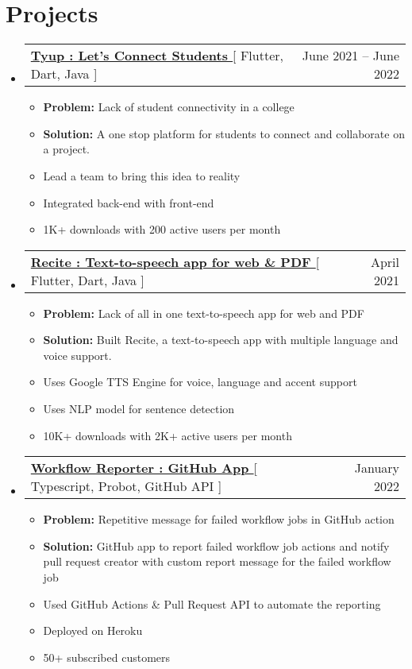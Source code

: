 \documentclass[letterpaper,11pt]{article}
\makeatletter
\newcommand{\resumeItem}[1]{
  \item\small{
    {#1 \vspace{-2pt}}
  }
}
\newcommand{\resumeProjectHeading}[2]{
    \item
    \begin{tabular*}{0.97\textwidth}{l@{\extracolsep{\fill}}r}
      \small#1 & #2 \\
    \end{tabular*}\vspace{-7pt}
}
\newcommand{\resumeSubHeadingListStart}{\begin{itemize}[leftmargin=0.15in, label={}]}
\newcommand{\resumeSubHeadingListEnd}{\end{itemize}}
\newcommand{\resumeItemListStart}{\begin{itemize}}
\newcommand{\resumeItemListEnd}{\end{itemize}\vspace{-5pt}}
\makeatother
\begin{document}


\section{Projects}
    
    \resumeSubHeadingListStart
      \resumeProjectHeading
          {\textbf{\href{https://play.google.com/store/apps/details?id=org.elitecaps.tyup}{Tyup : Let's Connect Students }}{[ Flutter, Dart, Java ]}}{June 2021 -- June 2022}
          \resumeItemListStart
           \resumeItem{\textbf{Problem:} {Lack of student connectivity in a college} }
           \resumeItem{\textbf{Solution:} A one stop platform for students to connect and collaborate on a project.}
           \resumeItem{Lead a team to bring this idea to reality}
           \resumeItem{Integrated back-end with front-end}
           \resumeItem{1K+ downloads with 200 active users per month}
          \resumeItemListEnd
    \resumeSubHeadingListEnd
    
    \resumeSubHeadingListStart
      \resumeProjectHeading
          {\textbf{\href{https://play.google.com/store/apps/details?id=com.hackthedeveloper.recite}{Recite : Text-to-speech app for web \& PDF }}{[ Flutter, Dart, Java ]}}{April 2021}
          \resumeItemListStart
           \resumeItem{\textbf{Problem:} {Lack of all in one text-to-speech app for web and PDF} }
           \resumeItem{\textbf{Solution:} Built Recite, a text-to-speech app with multiple language and voice support.}
           \resumeItem{Uses Google TTS Engine for voice, language and accent support}
           \resumeItem{Uses NLP model for sentence detection}
           \resumeItem{10K+ downloads with 2K+ active users per month}
          \resumeItemListEnd
    \resumeSubHeadingListEnd

    \resumeSubHeadingListStart
      \resumeProjectHeading
          {\textbf{\href{https://github.com/marketplace/workflow-reporter} {Workflow Reporter : GitHub App }}{[ Typescript, Probot, GitHub API ]}}{January 2022}
          \resumeItemListStart
           \resumeItem{\textbf{Problem:} {Repetitive message for failed workflow jobs in GitHub action} }
           \resumeItem{\textbf{Solution:} GitHub app to report failed workflow job actions and notify pull request creator with custom report message for the failed workflow job}
           \resumeItem{Used GitHub Actions \& Pull Request API to automate the reporting}
           \resumeItem{Deployed on Heroku}
           \resumeItem{50+ subscribed customers}
          \resumeItemListEnd
    \resumeSubHeadingListEnd
\end{document}
